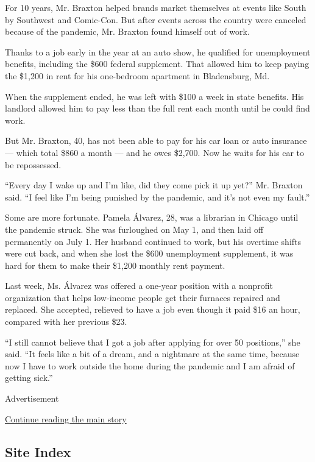 For 10 years, Mr. Braxton helped brands market themselves at events like
South by Southwest and Comic-Con. But after events across the country
were canceled because of the pandemic, Mr. Braxton found himself out of
work.

Thanks to a job early in the year at an auto show, he qualified for
unemployment benefits, including the \$600 federal supplement. That
allowed him to keep paying the \$1,200 in rent for his one-bedroom
apartment in Bladensburg, Md.

When the supplement ended, he was left with \$100 a week in state
benefits. His landlord allowed him to pay less than the full rent each
month until he could find work.

But Mr. Braxton, 40, has not been able to pay for his car loan or auto
insurance --- which total \$860 a month --- and he owes \$2,700. Now he
waits for his car to be repossessed.

``Every day I wake up and I'm like, did they come pick it up yet?'' Mr.
Braxton said. ``I feel like I'm being punished by the pandemic, and it's
not even my fault.''

Some are more fortunate. Pamela Álvarez, 28, was a librarian in Chicago
until the pandemic struck. She was furloughed on May 1, and then laid
off permanently on July 1. Her husband continued to work, but his
overtime shifts were cut back, and when she lost the \$600 unemployment
supplement, it was hard for them to make their \$1,200 monthly rent
payment.

Last week, Ms. Álvarez was offered a one-year position with a nonprofit
organization that helps low-income people get their furnaces repaired
and replaced. She accepted, relieved to have a job even though it paid
\$16 an hour, compared with her previous \$23.

``I still cannot believe that I got a job after applying for over 50
positions,'' she said. ``It feels like a bit of a dream, and a nightmare
at the same time, because now I have to work outside the home during the
pandemic and I am afraid of getting sick.''

Advertisement

\protect\hyperlink{after-bottom}{Continue reading the main story}

\hypertarget{site-index}{%
\subsection{Site Index}\label{site-index}}

